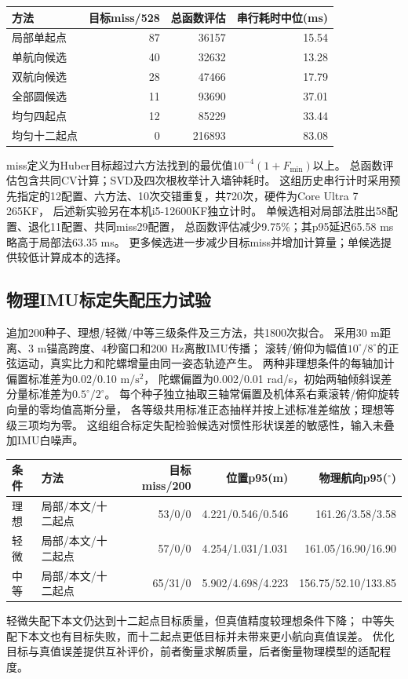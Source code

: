 \documentclass[11pt,a4paper]{ctexart}
\begin{document}
\begin{center}\small
\begin{tabular}{lrrr}
\toprule
方法&目标miss/528&总函数评估&串行耗时中位(ms)\\
\midrule
局部单起点&87&36157&15.54\\
单航向候选&40&32632&13.28\\
双航向候选&28&47466&17.79\\
全部圆候选&11&93690&37.01\\
均匀四起点&12&85229&33.44\\
均匀十二起点&0&216893&83.08\\
\bottomrule
\end{tabular}
\end{center}
miss定义为Huber目标超过六方法找到的最优值$10^{-4}(1+F_{\min})$以上。
总函数评估包含共同CV计算；SVD及四次根枚举计入墙钟耗时。
这组历史串行计时采用预先指定的12配置、六方法、10次交错重复，共720次，硬件为Core Ultra 7 265KF，
后述新实验另在本机i5-12600KF独立计时。
单候选相对局部法胜出58配置、退化11配置、共同miss29配置，
总函数评估减少9.75\%；其p95延迟65.58 ms略高于局部法63.35 ms。
更多候选进一步减少目标miss并增加计算量；单候选提供较低计算成本的选择。

\subsection{物理IMU标定失配压力试验}
追加200种子、理想/轻微/中等三级条件及三方法，共1800次拟合。
采用30 m距离、3 m锚高跨度、4秒窗口和200 Hz离散IMU传播；
滚转/俯仰为幅值$10^\circ/8^\circ$的正弦运动，真实比力和陀螺增量由同一姿态轨迹产生。
两种非理想条件的每轴加计偏置标准差为0.02/0.10 $\mathrm{m/s^2}$，
陀螺偏置为0.002/0.01 rad/s，初始两轴倾斜误差分量标准差为$0.5^\circ/2^\circ$。
每个种子独立抽取三轴常偏置及机体系右乘滚转/俯仰旋转向量的零均值高斯分量，
各等级共用标准正态抽样并按上述标准差缩放；理想等级三项均为零。
这组组合标定失配检验候选对惯性形状误差的敏感性，输入未叠加IMU白噪声。

\begin{center}\small
\begin{tabular}{llrrr}
\toprule
条件&方法&目标miss/200&位置p95(m)&物理航向p95($^\circ$)\\
\midrule
理想&局部/本文/十二起点&53/0/0&4.221/0.546/0.546&161.26/3.58/3.58\\
轻微&局部/本文/十二起点&57/0/0&4.254/1.031/1.031&161.05/16.90/16.90\\
中等&局部/本文/十二起点&65/31/0&5.902/4.698/4.223&156.75/52.10/133.85\\
\bottomrule
\end{tabular}
\end{center}
轻微失配下本文仍达到十二起点目标质量，但真值精度较理想条件下降；
中等失配下本文也有目标失败，而十二起点更低目标并未带来更小航向真值误差。
优化目标与真值误差提供互补评价，前者衡量求解质量，后者衡量物理模型的适配程度。
\end{document}
